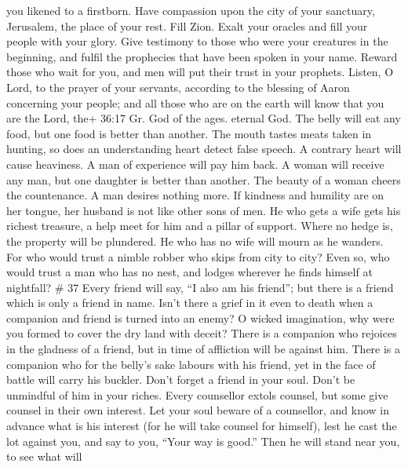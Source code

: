 you likened to a firstborn.  Have compassion upon the city
of your sanctuary, Jerusalem, the place of your rest.  Fill
Zion. Exalt your oracles and fill your people with your glory.
 Give testimony to those who were your creatures in the
beginning, and fulfil the prophecies that have been spoken in your name.
 Reward those who wait for you, and men will put their
trust in your prophets.  Listen, O Lord, to the prayer of
your servants, according to the blessing of Aaron concerning your
people; and all those who are on the earth will know that you are the
Lord, the+ 36:17 Gr. God of the ages. eternal God.  The
belly will eat any food, but one food is better than another.
 The mouth tastes meats taken in hunting, so does an
understanding heart detect false speech.  A contrary heart
will cause heaviness. A man of experience will pay him back.
 A woman will receive any man, but one daughter is better
than another.  The beauty of a woman cheers the
countenance. A man desires nothing more.  If kindness and
humility are on her tongue, her husband is not like other sons of men.
 He who gets a wife gets his richest treasure, a help meet
for him and a pillar of support.  Where no hedge is, the
property will be plundered. He who has no wife will mourn as he wanders.
 For who would trust a nimble robber who skips from city to
city? Even so, who would trust a man who has no nest, and lodges
wherever he finds himself at nightfall? \# 37  Every friend
will say, ``I also am his friend''; but there is a friend which is only
a friend in name.  Isn't there a grief in it even to death
when a companion and friend is turned into an enemy?  O
wicked imagination, why were you formed to cover the dry land with
deceit?  There is a companion who rejoices in the gladness
of a friend, but in time of affliction will be against him. 
There is a companion who for the belly's sake labours with his friend,
yet in the face of battle will carry his buckler.  Don't
forget a friend in your soul. Don't be unmindful of him in your riches.
 Every counsellor extols counsel, but some give counsel in
their own interest.  Let your soul beware of a counsellor,
and know in advance what is his interest (for he will take counsel for
himself), lest he cast the lot against you,  and say to you,
``Your way is good.'' Then he will stand near you, to see what will
